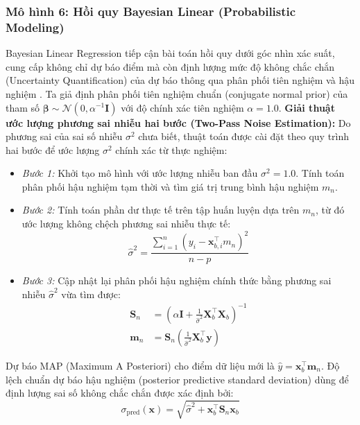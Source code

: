 \documentclass[12pt,a4paper]{article}
\begin{document}
\subsubsection{Mô hình 6: Hồi quy Bayesian Linear (Probabilistic Modeling)}
Bayesian Linear Regression tiếp cận bài toán hồi quy dưới góc nhìn xác suất, cung cấp không chỉ dự báo điểm mà còn định lượng mức độ không chắc chắn (Uncertainty Quantification) của dự báo thông qua phân phối tiên nghiệm và hậu nghiệm \cite{murphy}.
Ta giả định phân phối tiên nghiệm chuẩn (conjugate normal prior) của tham số $\boldsymbol{\beta} \sim \mathcal{N}(0, \alpha^{-1} \mathbf{I})$ với độ chính xác tiên nghiệm $\alpha = 1.0$.
\textbf{Giải thuật ước lượng phương sai nhiễu hai bước (Two-Pass Noise Estimation):}
Do phương sai của sai số nhiễu $\sigma^2$ chưa biết, thuật toán được cài đặt theo quy trình hai bước để ước lượng $\sigma^2$ chính xác từ thực nghiệm:
\begin{itemize}
    \item \textit{Bước 1:} Khởi tạo mô hình với ước lượng nhiễu ban đầu $\sigma^2 = 1.0$. Tính toán phân phối hậu nghiệm tạm thời và tìm giá trị trung bình hậu nghiệm $m_n$.
    \item \textit{Bước 2:} Tính toán phần dư thực tế trên tập huấn luyện dựa trên $m_n$, từ đó ước lượng không chệch phương sai nhiễu thực tế:
    \begin{equation}
        \hat{\sigma}^2 = \frac{\sum_{i=1}^n (y_i - \mathbf{x}_{b, i}^\top m_n)^2}{n - p}
    \end{equation}
    \item \textit{Bước 3:} Cập nhật lại phân phối hậu nghiệm chính thức bằng phương sai nhiễu $\hat{\sigma}^2$ vừa tìm được:
    \begin{align}
        \mathbf{S}_n &= \left( \alpha \mathbf{I} + \frac{1}{\hat{\sigma}^2} \mathbf{X}_b^\top \mathbf{X}_b \right)^{-1} \\
        \mathbf{m}_n &= \mathbf{S}_n \left( \frac{1}{\hat{\sigma}^2} \mathbf{X}_b^\top \mathbf{y} \right)
    \end{align}
\end{itemize}
Dự báo MAP (Maximum A Posteriori) cho điểm dữ liệu mới là $\hat{y} = \mathbf{x}_b^\top \mathbf{m}_n$. 
Độ lệch chuẩn dự báo hậu nghiệm (posterior predictive standard deviation) dùng để định lượng sai số không chắc chắn được xác định bởi:
\begin{equation}
    \sigma_{\text{pred}}(\mathbf{x}) = \sqrt{\hat{\sigma}^2 + \mathbf{x}_b^\top \mathbf{S}_n \mathbf{x}_b}
\end{equation}
\end{document}
